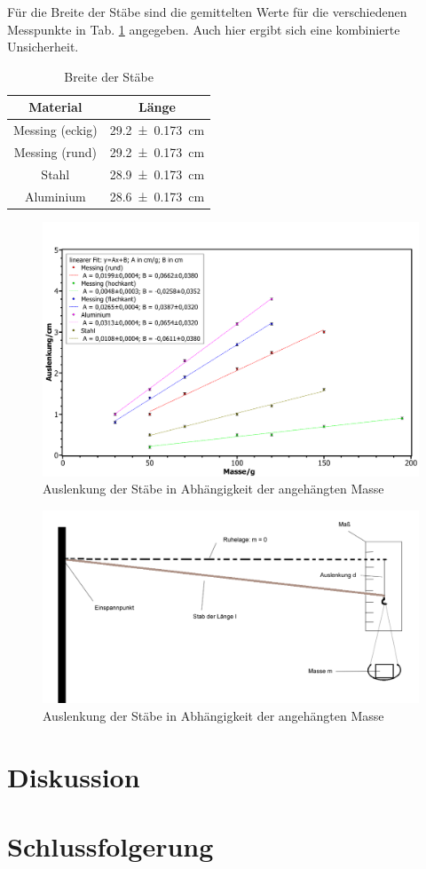 \documentclass[11pt,a4paper,titlepage, ngerman]{article}
\begin{document}
		Für die Breite der Stäbe sind die gemittelten Werte für die verschiedenen Messpunkte in Tab. \ref{tab:Stabbreiten} angegeben. Auch hier ergibt sich  eine kombinierte Unsicherheit.
		\begin{table}[h]
			\caption{Breite der Stäbe}
			\centering
			\label{tab:Stabbreiten}
			\begin{tabular}{c|c}
				{Material} & {Länge}\\
				\hline
				{Messing (eckig)} & \SI{29,2+-0,173}{\cm}\\
				{Messing (rund)} &  \SI{29,2+-0,173}{\cm}\\
				{Stahl} & \SI{28,9+-0,173}{\cm}\\
				{Aluminium} & \SI{28,6+-0,173}{\cm}\\		
			\end{tabular}
		\end{table}
		
		\begin{figure}[ht]
			\centering
			\includegraphics[width=\textwidth]{StabAuslenkungen.pdf}
			\caption{Auslenkung der Stäbe in Abhängigkeit der angehängten Masse}
			\label{abb:linearerFit}	
		\end{figure}
			
		\begin{figure}[ht]
			\centering
			\includegraphics[width=\textwidth]{StabAuslenkungSkizze.png}
			\caption{Auslenkung der Stäbe in Abhängigkeit der angehängten Masse}
			\label{abb:2}	
		\end{figure}	
		
	\section{Diskussion}
	
	\section{Schlussfolgerung}

	
\end{document}
